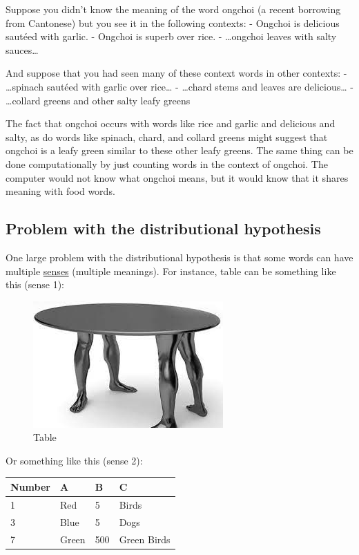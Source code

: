 \documentclass[
  11pt,
  british,
]{article}
\begin{document}
Suppose you didn't know the meaning of the word ongchoi (a recent
borrowing from Cantonese) but you see it in the following contexts: -
Ongchoi is delicious sautéed with garlic. - Ongchoi is superb over rice.
- \ldots ongchoi leaves with salty sauces\ldots{}

And suppose that you had seen many of these context words in other
contexts: - \ldots spinach sautéed with garlic over rice\ldots{} -
\ldots chard stems and leaves are delicious\ldots{} - \ldots collard
greens and other salty leafy greens

The fact that ongchoi occurs with words like rice and garlic and
delicious and salty, as do words like spinach, chard, and collard greens
might suggest that ongchoi is a leafy green similar to these other leafy
greens. The same thing can be done computationally by just counting
words in the context of ongchoi. The computer would not know what
ongchoi means, but it would know that it shares meaning with food words.

\hypertarget{problem-with-the-distributional-hypothesis}{%
\subsection{Problem with the distributional
hypothesis}\label{problem-with-the-distributional-hypothesis}}

One large problem with the distributional hypothesis is that some words
can have multiple \href{../Data/Lemma.md}{senses} (multiple meanings).
For instance, table can be something like this (sense 1):

\begin{figure}
\centering
\includegraphics{Pasted_image_20220603161925.png}
\caption{Table}
\end{figure}

Or something like this (sense 2):

\begin{longtable}[]{@{}llll@{}}
\toprule
Number & A & B & C \\
\midrule
\endhead
1 & Red & 5 & Birds \\
3 & Blue & 5 & Dogs \\
7 & Green & 500 & Green Birds \\
\bottomrule
\end{longtable}
\end{document}
